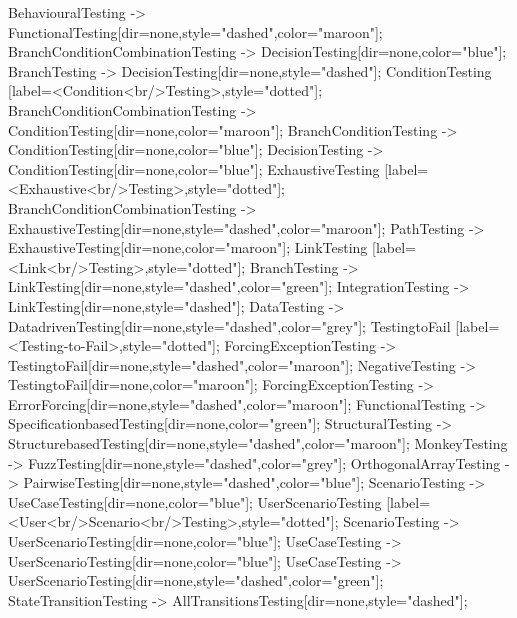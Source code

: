\documentclass{article}
\begin{document}
{BehaviouralTesting -> FunctionalTesting[dir=none,style="dashed",color="maroon"];
BranchConditionCombinationTesting -> DecisionTesting[dir=none,color="blue"];
BranchTesting -> DecisionTesting[dir=none,style="dashed"];
ConditionTesting [label=<Condition<br/>Testing>,style="dotted"];
BranchConditionCombinationTesting -> ConditionTesting[dir=none,color="maroon"];
BranchConditionTesting -> ConditionTesting[dir=none,color="blue"];
DecisionTesting -> ConditionTesting[dir=none,color="blue"];
ExhaustiveTesting [label=<Exhaustive<br/>Testing>,style="dotted"];
BranchConditionCombinationTesting -> ExhaustiveTesting[dir=none,style="dashed",color="maroon"];
PathTesting -> ExhaustiveTesting[dir=none,color="maroon"];
LinkTesting [label=<Link<br/>Testing>,style="dotted"];
BranchTesting -> LinkTesting[dir=none,style="dashed",color="green"];
IntegrationTesting -> LinkTesting[dir=none,style="dashed"];
DataTesting -> DatadrivenTesting[dir=none,style="dashed",color="grey"];
TestingtoFail [label=<Testing-to-Fail>,style="dotted"];
ForcingExceptionTesting -> TestingtoFail[dir=none,style="dashed",color="maroon"];
NegativeTesting -> TestingtoFail[dir=none,color="maroon"];
ForcingExceptionTesting -> ErrorForcing[dir=none,style="dashed",color="maroon"];
FunctionalTesting -> SpecificationbasedTesting[dir=none,color="green"];
StructuralTesting -> StructurebasedTesting[dir=none,style="dashed",color="maroon"];
MonkeyTesting -> FuzzTesting[dir=none,style="dashed",color="grey"];
OrthogonalArrayTesting -> PairwiseTesting[dir=none,style="dashed",color="blue"];
ScenarioTesting -> UseCaseTesting[dir=none,color="blue"];
UserScenarioTesting [label=<User<br/>Scenario<br/>Testing>,style="dotted"];
ScenarioTesting -> UserScenarioTesting[dir=none,color="blue"];
UseCaseTesting -> UserScenarioTesting[dir=none,color="blue"];
UseCaseTesting -> UserScenarioTesting[dir=none,style="dashed",color="green"];
StateTransitionTesting -> AllTransitionsTesting[dir=none,style="dashed"];

}
\end{document}
